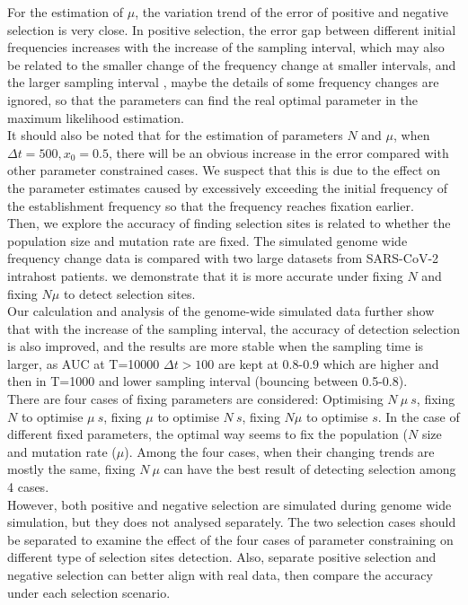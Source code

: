\documentclass[12pt]{article}
\begin{document}
For the estimation of $\mu$, the variation trend of the error of positive and negative selection is very close. In positive selection, the error gap between different initial frequencies increases with the increase of the sampling interval, which may also be related to the smaller change of the frequency change at smaller intervals, and the larger sampling interval , maybe the details of some frequency changes are ignored, so that the parameters can find the real optimal parameter in the maximum likelihood estimation.\\

It should also be noted that for the estimation of parameters $N$ and $\mu$, when $\Delta t=500, x_0=0.5$, there will be an obvious increase in the error compared with other parameter constrained cases. We suspect that this is due to the effect on the parameter estimates caused by excessively exceeding the initial frequency of the establishment frequency so that the frequency reaches fixation earlier.\\

Then, we explore the accuracy of finding selection sites is related to whether the population size and mutation rate are fixed. The simulated genome wide frequency change data is compared with two large datasets from SARS-CoV-2 intrahost patients. we demonstrate that it is more accurate under fixing $N$ and fixing $N \mu$ to detect selection sites.\\

Our calculation and analysis of the genome-wide simulated data further show that with the increase of the sampling interval, the accuracy of detection selection is also improved, and the results are more stable when the sampling time is larger, as AUC at T=10000 $\Delta t>100$ are kept at 0.8-0.9 which are higher and then in T=1000 and lower sampling interval (bouncing between 0.5-0.8).\\

There are four cases of fixing parameters are considered: Optimising $N\ \mu\ s$, fixing $N$ to optimise $\mu\ s$, fixing $\mu$ to optimise $N\ s$, fixing $N \mu$ to optimise $s$. In the case of different fixed parameters, the optimal way seems to fix the population ($N$ size and mutation rate ($\mu$). Among the four cases, when their changing trends are mostly the same, fixing $N\ \mu$ can have the best result of detecting selection among 4 cases.\\

However, both positive and negative selection are simulated during genome wide simulation, but they does not analysed separately. The two selection cases should be separated to examine the effect of the four cases of parameter constraining on different type of selection sites detection.  Also, separate positive selection and  negative selection can better align with real data, then compare the accuracy under each selection scenario.\\
\end{document}
